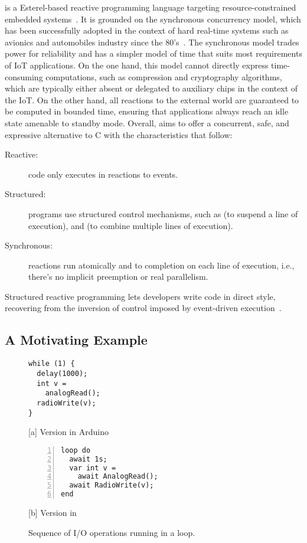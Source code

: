 \CEU is a Esterel-based\cite{ceu.tecs17} reactive programming language
targeting resource-constrained embedded systems~\cite{ceu.sensys13}.
%
It is grounded on the synchronous concurrency model, which has been
successfully adopted in the context of hard real-time systems such as avionics
and automobiles industry since the 80's~\cite{rp.twelve}.
%
The synchronous model trades power for reliability and has a simpler model
of time that suits most requirements of IoT applications.
%
On the one hand, this model cannot directly express time-consuming
computations, such as compression and cryptography algorithms, which are
typically either absent or delegated to auxiliary chips in the context of the
IoT.
%
On the other hand, all reactions to the external world are guaranteed to be
computed in bounded time, ensuring that applications always reach an idle state
amenable to standby mode.
%
Overall, \CEU aims to offer a concurrent, safe, and expressive alternative to C
with the characteristics that follow:
%
\begin{description}
\item [Reactive:] code only executes in reactions to events.
\item [Structured:] programs use structured control mechanisms, such as
     (to suspend a line of execution), and  (to combine
    multiple lines of execution).
\item [Synchronous:] reactions run atomically and to completion on each line of
    execution, i.e., there's no implicit preemption or real parallelism.
\end{description}
%
Structured reactive programming lets developers write code in direct style,
recovering from the inversion of control imposed by event-driven
execution~\cite{rp.deprecating,rp.rescala,sync_async.cooperative}.

\subsection*{A Motivating Example}
\label{sec.ceu.example}

{\linespread{1}
\begin{figure}[t]
\begin{minipage}[t]{0.49\linewidth}
\begin{lstlisting}[xrightmargin=0.5cm]
while (1) {
  delay(1000);
  int v =
    analogRead();
  radioWrite(v);
}
\end{lstlisting}
\centering\small{[a] Version in Arduino}
\end{minipage}
%
\begin{minipage}[t]{0.49\linewidth}
\begin{lstlisting}[numbers=left,xleftmargin=-0.2cm]
loop do
  await 1s;
  var int v =
    await AnalogRead();
  await RadioWrite(v);
end
\end{lstlisting}
\centering\small{[b] Version in \CEU}
\end{minipage}
\caption{ Sequence of I/O operations running in a loop.
\label{lst.direct}
}
\end{figure}
}


